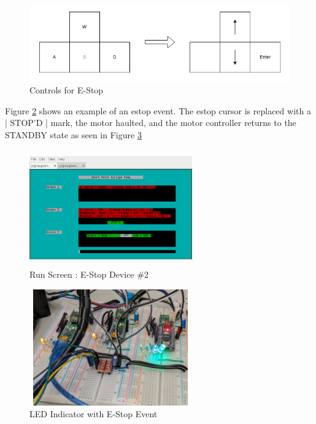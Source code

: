 \documentclass[journal]{IEEEtran}
\begin{document}
            \begin{figure}[H]
                \centering
                \includegraphics[scale = 0.35]{KeySel_estop}
                \caption{Controls for E-Stop}
                \label{fig:key_estop}
            \end{figure}
            
            Figure \ref{fig:GUI10} shows an example of an estop event. The estop cursor is replaced with a | STOP'D | mark, the motor haulted, and the motor controller returns to the STANDBY state as seen in Figure \ref{fig:GUI10_L}
            
            \begin{figure}[H]
                \centering
                \includegraphics[width=7cm, height=5cm]{GUI_10}
                \caption{Run Screen : E-Stop Device \#2}
                \label{fig:GUI10}
            \end{figure}
            
            \begin{figure}[H]
                \centering
                \includegraphics[width=7cm, height=5cm]{GUI_10_LED}
                \caption{LED Indicator with E-Stop Event}
                \label{fig:GUI10_L}
            \end{figure}
            
\end{document}
